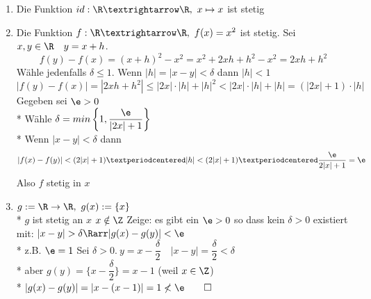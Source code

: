 \begin{enumerate}
\item{Die Funktion $id:\R→\R,\ x\mapsto x$ ist stetig}
\item{Die Funktion $f:\R→\R,\ f(x)=x^2$ ist stetig. %
\bew
Sei $x,y\in\R\quad y=x+h$.
$$f(y)-f(x)=(x+h)^2-x^2=x^2+2xh+h^2-x^2=2xh+h^2$$
Wähle jedenfalls $\delta\leq 1$. Wenn $|h|=|x-y|<\delta$ dann $|h|<1$
$$|f(y)-f(x)|=|2xh+h^2|\leq|2x|·|h|+|h|^2<|2x|·|h|+|h|=(|2x|+1)·|h|$$
Gegeben sei $\e>0$\\*
Wähle $\delta=min\left\{1,\dfrac{\e}{|2x|+1}\right\}$\\*
Wenn $|x-y|<\delta$ dann
$$|f(x)-f(y)|<(2|x|+1)·|h|<(2|x|+1)·\dfrac{\e}{2|x|+1}=\e$$
Also $f$ stetig in $x$}
\item{$g:=\R \to \R,\ g(x):=\{x\}$\\*
$g$ ist stetig an $x$ \equ $x\notin\Z$
Zeige: es gibt ein $\e>0$ so dass kein $\delta>0$ existiert mit: $|x-y|>\delta\Rarr|g(x)-g(y)|<\e$\\*
z.B. $\e=1$ Sei $\delta>0.\ y=x-\dfrac{\delta}{2}\quad |x-y|=\dfrac{\delta}{2}<\delta$\\*
aber $g(y)=\{x-\dfrac{\delta}{2}\}=x-1$ (weil $x\in\Z$)\\*
$|g(x)-g(y)|=|x-(x-1)|=1 \not<\e\qed$}
\end{enumerate}

